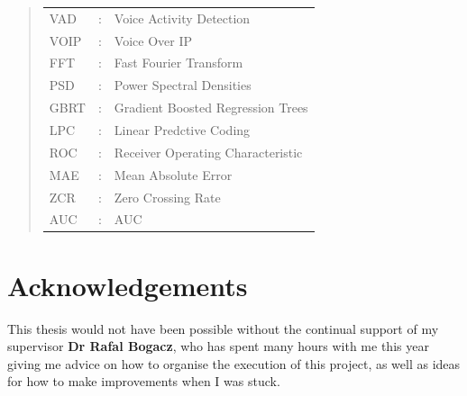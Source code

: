 \documentclass[ %
                    author={Sam Phippen},
                supervisor={Dr. Rafal Bogacz},
                     title={Real time voice activity detectors in noisy personal computing environments},
                  subtitle={},
                    degree={MEng},
                      year={2012} ]{thesis}
\begin{document}
\begin{quote}
\noindent
\begin{tabular}{lcl}
    VAD                 &:     & Voice Activity Detection                 \\
    VOIP                &:     & Voice Over IP\\
    FFT                 &:     & Fast Fourier Transform\\
    PSD                 &:     & Power Spectral Densities\\
    GBRT                &:     & Gradient Boosted Regression Trees \\
    LPC                 &:     & Linear Predctive Coding \\
    ROC                 &:     & Receiver Operating Characteristic \\
    MAE                 &:     & Mean Absolute Error \\
    ZCR                 &:     & Zero Crossing Rate \\
    AUC                 &:     & AUC \\


\end{tabular}
\end{quote}


\chapter*{Acknowledgements}

\vspace{1cm}

This thesis would not have been possible without the continual support of my
supervisor {\bf Dr Rafal Bogacz}, who has spent many hours with me this year giving
me advice on how to organise the execution of this project, as well as ideas
for how to make improvements when I was stuck.
\end{document}

